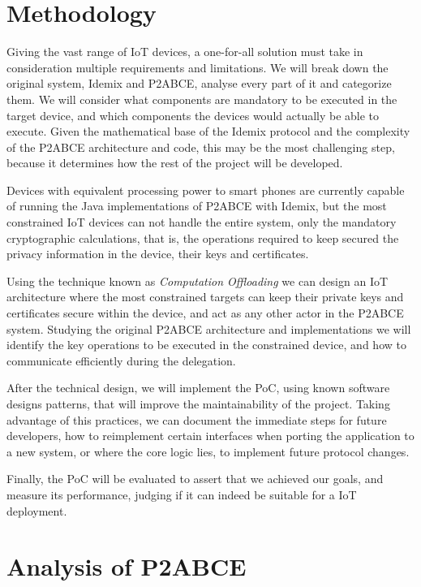 \section{Methodology}

Giving the vast range of IoT devices, a one-for-all solution must take in consideration multiple requirements and limitations. We will break down the original system, Idemix and P2ABCE, analyse every part of it and categorize them. We will consider what components are mandatory to be executed in the target device, and which components the devices would actually be able to execute. Given the mathematical base of the Idemix protocol and the complexity of the P2ABCE architecture and code, this may be the most challenging step, because it determines how the rest of the project will be developed.

Devices with equivalent processing power to smart phones are currently capable of running the Java implementations of P2ABCE with Idemix, but the most constrained IoT devices can not handle the entire system, only the mandatory cryptographic calculations, that is, the operations required to keep secured the privacy information in the device, their keys and certificates.

Using the technique known as \textit{Computation Offloading} we can design an IoT architecture where the most constrained targets can keep their private keys and certificates secure within the device, and act as any other actor in the P2ABCE system. Studying the original P2ABCE architecture and implementations we will identify the key operations to be executed in the constrained device, and how to communicate efficiently during the delegation.

After the technical design, we will implement the PoC, using known software designs patterns, that will improve the maintainability of the project. Taking advantage of this practices, we can document the immediate steps for future developers, how to reimplement certain interfaces when porting the application to a new system, or where the core logic lies, to implement future protocol changes.

Finally, the PoC will be evaluated to assert that we achieved our goals, and measure its performance, judging if it can indeed be suitable for a IoT deployment.



\section{Analysis of P2ABCE}\label{analysisP2ABCE}

